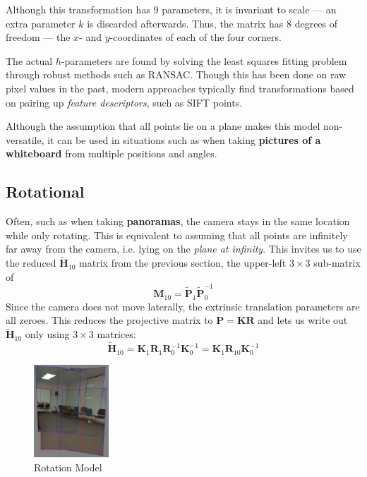 \documentclass{article}
\let\vec\mathbf
\begin{document}
Although this transformation has 9 parameters, it is invariant to scale — an extra parameter $k$ is discarded afterwards.
Thus, the matrix has 8 degrees of freedom — the $x$- and $y$-coordinates of each of the four corners.

The actual $h$-parameters are found by solving the least squares fitting problem through robust methods such as RANSAC.
Though this has been done on raw pixel values in the past, modern approaches typically find transformations based on pairing up \textit{feature descriptors}, such as SIFT points.

Although the assumption that all points lie on a plane makes this model non-versatile, it can be used in situations such as when taking \textbf{pictures of a whiteboard} from multiple positions and angles.

\subsection{Rotational}
Often, such as when taking \textbf{panoramas}, the camera stays in the same location while only rotating.
This is equivalent to assuming that all points are infinitely far away from the camera, i.e. lying on the \textit{plane at infinity}.
This invites us to use the reduced $\tilde{\boldsymbol{H}}_{10}$ matrix from the previous section, the upper-left $3\times 3$ sub-matrix of
$$
\boldsymbol{M}_{10} = \tilde{\boldsymbol{P}}_{1} \tilde{\boldsymbol{P}}_{0}^{-1}
$$
Since the camera does not move laterally, the extrinsic translation parameters are all zeroes.
This reduces the projective matrix to $\vec{P}=\vec{K}\vec{R}$ and lets us write out $\tilde{\boldsymbol{H}}_{10}$ only using $3\times 3$ matrices:
$$ 
\tilde{\boldsymbol{H}}_{10}=\boldsymbol{K}_{1} \boldsymbol{R}_{1} \boldsymbol{R}_{0}^{-1} \boldsymbol{K}_{0}^{-1}=\boldsymbol{K}_{1} \boldsymbol{R}_{10} \boldsymbol{K}_{0}^{-1}
$$
\begin{figure}
  \vspace{-30pt}
  \begin{center}
    \includegraphics[width=0.25\textwidth]{rotation.png}
  \end{center}
  \vspace{-15pt}
  \caption{Rotation Model}
  \vspace{-30pt}
\end{figure}
\end{document}
